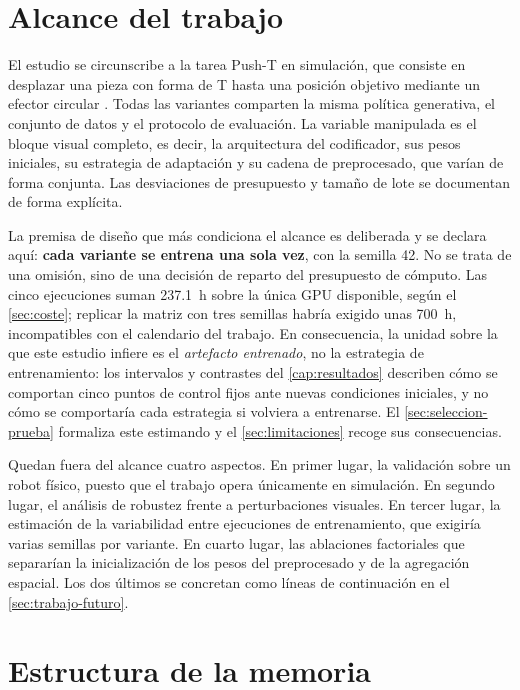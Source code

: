 \section{Alcance del trabajo}
\label{sec:alcance}

El estudio se circunscribe a la tarea Push-T en simulaci\'on, que consiste en desplazar
una pieza con forma de T hasta una posici\'on objetivo mediante un efector circular
\cite{chi2025diffusion}. Todas las variantes comparten la misma pol\'itica generativa, el
conjunto de datos y el protocolo de evaluaci\'on. La variable manipulada es el bloque
visual completo, es decir, la arquitectura del codificador, sus pesos iniciales, su
estrategia de adaptaci\'on y su cadena de preprocesado, que var\'ian de forma conjunta.
Las desviaciones de presupuesto y tama\~no de lote se documentan de forma expl\'icita.

La premisa de dise\~no que m\'as condiciona el alcance es deliberada y se declara aqu\'i:
\textbf{cada variante se entrena una sola vez}, con la semilla \num{42}. No se trata de
una omisi\'on, sino de una decisi\'on de reparto del presupuesto de c\'omputo. Las cinco
ejecuciones suman \SI{237.1}{\hour} sobre la \'unica GPU disponible, seg\'un el
\cref{sec:coste}; replicar la matriz con tres semillas habr\'ia exigido unas
\SI{700}{\hour}, incompatibles con el calendario del trabajo. En consecuencia, la unidad
sobre la que este estudio infiere es el \emph{artefacto entrenado}, no la estrategia de
entrenamiento: los intervalos y contrastes del \cref{cap:resultados} describen c\'omo se
comportan cinco puntos de control fijos ante nuevas condiciones iniciales, y no c\'omo se
comportar\'ia cada estrategia si volviera a entrenarse. El
\cref{sec:seleccion-prueba} formaliza este estimando y el \cref{sec:limitaciones} recoge
sus consecuencias.

Quedan fuera del alcance cuatro aspectos. En primer lugar, la validaci\'on sobre un robot
f\'isico, puesto que el trabajo opera \'unicamente en simulaci\'on. En segundo lugar, el
an\'alisis de robustez frente a perturbaciones visuales. En tercer lugar, la estimaci\'on
de la variabilidad entre ejecuciones de entrenamiento, que exigir\'ia varias semillas por
variante. En cuarto lugar, las ablaciones factoriales que separar\'ian la inicializaci\'on
de los pesos del preprocesado y de la agregaci\'on espacial. Los dos \'ultimos se
concretan como l\'ineas de continuaci\'on en el \cref{sec:trabajo-futuro}.

\section{Estructura de la memoria}
\label{sec:estructura}

